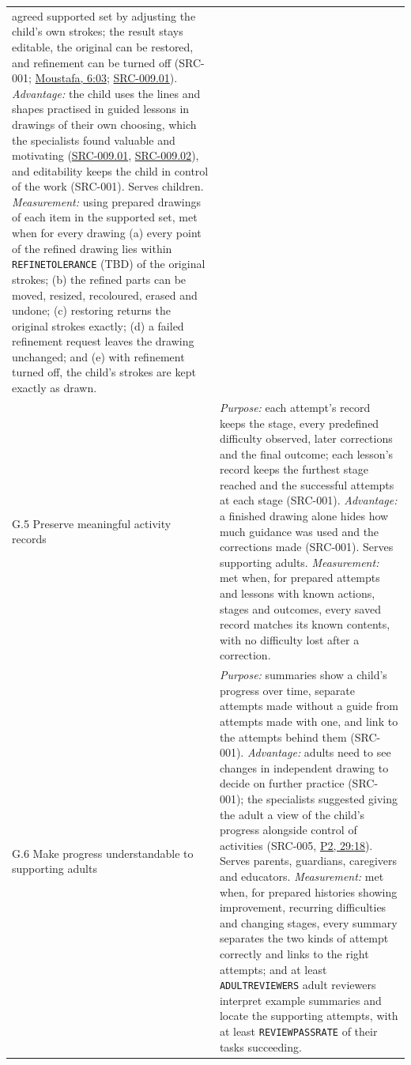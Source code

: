 \documentclass[12pt]{article}
\renewcommand{\_}{\textunderscore\allowbreak}%
\newcommand{\intlink}[3]{\hyperref[int:#1-#2]{#3}}
\newcommand{\intref}[2]{\intlink{#1}{#2}{#1, #2}}
\begin{document}
{\begin{longtable}{@{}>{\raggedright\arraybackslash}p{}p{}@{}}
agreed supported set by adjusting the child's own strokes; the result stays
editable, the original can be restored, and refinement can be turned off
(SRC-001; \intref{Moustafa}{6:03}; \hyperref[src:009.01]{SRC-009.01}).
\emph{Advantage:} the child uses the lines and shapes practised in guided
lessons in drawings of their own choosing, which the specialists found valuable
and motivating (\hyperref[src:009.01]{SRC-009.01},
\hyperref[src:009.02]{SRC-009.02}), and editability keeps the child in control
of the work (SRC-001). Serves children.
\emph{Measurement:} using prepared drawings of each item in the supported set,
met when for every drawing (a) every point of the refined drawing lies within
\texttt{REFINE\_TOLERANCE} (TBD) of the original strokes; (b) the refined parts
can be moved, resized, recoloured, erased and undone; (c) restoring returns the
original strokes exactly; (d) a failed refinement request leaves the drawing
unchanged; and (e) with refinement turned off, the child's strokes are kept
exactly as drawn. \\
\addlinespace
{}\label{goal:5}%
G.5 Preserve meaningful activity records & \emph{Purpose:} each attempt's record
keeps the stage, every predefined difficulty observed, later corrections and the
final outcome; each lesson's record keeps the furthest stage reached and the
successful attempts at each stage (SRC-001). \emph{Advantage:} a finished
drawing alone hides how much guidance was used and the corrections made
(SRC-001). Serves supporting adults. \emph{Measurement:} met when, for prepared
attempts and lessons with known actions, stages and outcomes, every saved record
matches its known contents, with no difficulty lost after a correction. \\
\addlinespace
{}\label{goal:6}%
G.6 Make progress understandable to supporting adults & \emph{Purpose:}
summaries show a child's progress over time, separate attempts made without a
guide from attempts made with one, and link to the attempts behind them
(SRC-001). \emph{Advantage:} adults need to see changes in independent drawing
to decide on further practice (SRC-001); the specialists suggested giving the
adult a view of the child's progress alongside control of activities (SRC-005,
\intref{P2}{29:18}). Serves parents, guardians, caregivers and educators.
\emph{Measurement:} met when, for prepared histories showing improvement,
recurring difficulties and changing stages, every summary separates the two
kinds of attempt correctly and links to the right attempts; and at least
\texttt{ADULT\_REVIEWERS} adult reviewers interpret example summaries and
locate the supporting attempts, with at least \texttt{REVIEW\_PASS\_RATE}
of their tasks succeeding. \\
\end{longtable}
}
\end{document}
